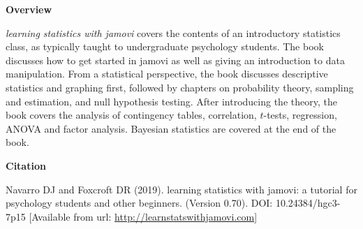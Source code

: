 

\clearpage
\newpage
\begin{center}
{\bf Overview}
\end{center}

\noindent
{\it learning statistics with jamovi} covers the contents of an introductory statistics class, as typically taught to undergraduate psychology students. The book discusses how to get started in jamovi as well as giving an introduction to data manipulation. From a statistical perspective, the book discusses descriptive statistics and graphing first, followed by chapters on probability theory, sampling and estimation, and null hypothesis testing. After introducing the theory, the book covers the analysis of contingency tables, correlation, $t$-tests, regression, ANOVA and factor analysis. Bayesian statistics are covered at the end of the book. 

\vspace{14cm}
\begin{center}
{\bf Citation}
\end{center}

\noindent
Navarro DJ and Foxcroft DR (2019). learning statistics with jamovi: a tutorial for psychology students and other beginners. (Version 0.70). DOI: 10.24384/hgc3-7p15 [Available from url: \url{http://learnstatswithjamovi.com}]